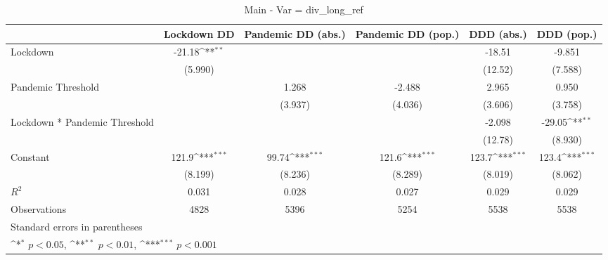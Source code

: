 \documentclass{article}
\begin{document}
{
\def\sym#1{\ifmmode^{#1}\else\(^{#1}\)\fi}
\begin{longtable}{l*{5}{c}}
\caption{Main - Var = div\_long\_ref}\\
\hline\hline\endfirsthead\hline\endhead\hline\endfoot\endlastfoot
                &\multicolumn{1}{c}{Lockdown DD}&\multicolumn{1}{c}{Pandemic DD (abs.)}&\multicolumn{1}{c}{Pandemic DD (pop.)}&\multicolumn{1}{c}{DDD (abs.)}&\multicolumn{1}{c}{DDD (pop.)}\\
\hline
Lockdown        &   -21.18\sym{**} &                  &                  &   -18.51         &   -9.851         \\
                &  (5.990)         &                  &                  &  (12.52)         &  (7.588)         \\
Pandemic Threshold&                  &    1.268         &   -2.488         &    2.965         &    0.950         \\
                &                  &  (3.937)         &  (4.036)         &  (3.606)         &  (3.758)         \\
Lockdown * Pandemic Threshold&                  &                  &                  &   -2.098         &   -29.05\sym{**} \\
                &                  &                  &                  &  (12.78)         &  (8.930)         \\
Constant        &    121.9\sym{***}&    99.74\sym{***}&    121.6\sym{***}&    123.7\sym{***}&    123.4\sym{***}\\
                &  (8.199)         &  (8.236)         &  (8.289)         &  (8.019)         &  (8.062)         \\
\hline
\(R^{2}\)       &    0.031         &    0.028         &    0.027         &    0.029         &    0.029         \\
Observations    &     4828         &     5396         &     5254         &     5538         &     5538         \\
\hline\hline
\multicolumn{6}{l}{\footnotesize Standard errors in parentheses}\\
\multicolumn{6}{l}{\footnotesize \sym{*} \(p<0.05\), \sym{**} \(p<0.01\), \sym{***} \(p<0.001\)}\\
\end{longtable}
}
\end{document}

